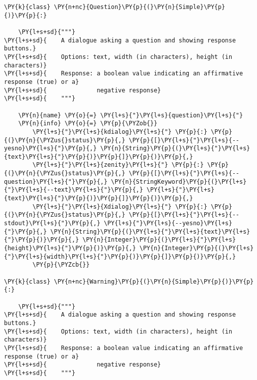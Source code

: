 \begin{Verbatim}[commandchars=\\\{\}]
\PY{k}{class} \PY{n+nc}{Question}\PY{p}{(}\PY{n}{Simple}\PY{p}{)}\PY{p}{:}

    \PY{l+s+sd}{"""}
\PY{l+s+sd}{    A dialogue asking a question and showing response buttons.}
\PY{l+s+sd}{    Options: text, width (in characters), height (in characters)}
\PY{l+s+sd}{    Response: a boolean value indicating an affirmative response (true) or a}
\PY{l+s+sd}{              negative response}
\PY{l+s+sd}{    """}

    \PY{n}{name} \PY{o}{=} \PY{l+s}{"}\PY{l+s}{question}\PY{l+s}{"}
    \PY{n}{info} \PY{o}{=} \PY{p}{\PYZob{}}
        \PY{l+s}{"}\PY{l+s}{kdialog}\PY{l+s}{"} \PY{p}{:} \PY{p}{(}\PY{n}{\PYZus{}status}\PY{p}{,} \PY{p}{[}\PY{l+s}{"}\PY{l+s}{--yesno}\PY{l+s}{"}\PY{p}{,} \PY{n}{String}\PY{p}{(}\PY{l+s}{"}\PY{l+s}{text}\PY{l+s}{"}\PY{p}{)}\PY{p}{]}\PY{p}{)}\PY{p}{,}
        \PY{l+s}{"}\PY{l+s}{zenity}\PY{l+s}{"} \PY{p}{:} \PY{p}{(}\PY{n}{\PYZus{}status}\PY{p}{,} \PY{p}{[}\PY{l+s}{"}\PY{l+s}{--question}\PY{l+s}{"}\PY{p}{,} \PY{n}{StringKeyword}\PY{p}{(}\PY{l+s}{"}\PY{l+s}{--text}\PY{l+s}{"}\PY{p}{,} \PY{l+s}{"}\PY{l+s}{text}\PY{l+s}{"}\PY{p}{)}\PY{p}{]}\PY{p}{)}\PY{p}{,}
        \PY{l+s}{"}\PY{l+s}{Xdialog}\PY{l+s}{"} \PY{p}{:} \PY{p}{(}\PY{n}{\PYZus{}status}\PY{p}{,} \PY{p}{[}\PY{l+s}{"}\PY{l+s}{--stdout}\PY{l+s}{"}\PY{p}{,} \PY{l+s}{"}\PY{l+s}{--yesno}\PY{l+s}{"}\PY{p}{,} \PY{n}{String}\PY{p}{(}\PY{l+s}{"}\PY{l+s}{text}\PY{l+s}{"}\PY{p}{)}\PY{p}{,} \PY{n}{Integer}\PY{p}{(}\PY{l+s}{"}\PY{l+s}{height}\PY{l+s}{"}\PY{p}{)}\PY{p}{,} \PY{n}{Integer}\PY{p}{(}\PY{l+s}{"}\PY{l+s}{width}\PY{l+s}{"}\PY{p}{)}\PY{p}{]}\PY{p}{)}\PY{p}{,}
        \PY{p}{\PYZcb{}}

\PY{k}{class} \PY{n+nc}{Warning}\PY{p}{(}\PY{n}{Simple}\PY{p}{)}\PY{p}{:}

    \PY{l+s+sd}{"""}
\PY{l+s+sd}{    A dialogue asking a question and showing response buttons.}
\PY{l+s+sd}{    Options: text, width (in characters), height (in characters)}
\PY{l+s+sd}{    Response: a boolean value indicating an affirmative response (true) or a}
\PY{l+s+sd}{              negative response}
\PY{l+s+sd}{    """}


\end{Verbatim}
